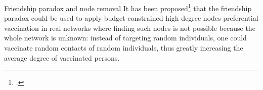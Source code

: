 \begin{textbox}{Friendship paradox and node removal}
    It has been proposed\footcite{cohen2003efficient} that the friendship paradox could be used to apply budget-constrained high degree nodes preferential vaccination in real networks where finding such nodes is not possible because the whole network is unknown: instead of targeting random individuals, one could vaccinate random contacts of random individuals, thus greatly increasing the average degree of vaccinated persons.
\end{textbox}








